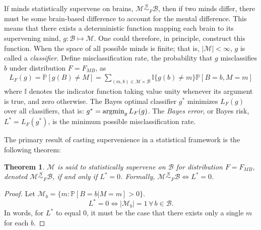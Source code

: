 \documentclass{article}
\newcommand{\mB}{\mathcal{B}}
\newcommand{\mM}{\mathcal{M}}
\newcommand{\PP}{\mathbb{P}}           %
\newcommand{\II}{\mathbb{I}}           %
\providecommand{\mc}[1]{\mathcal{#1}}
\providecommand{\mh}[1]{\widehat{#1}}
\newcommand{\argmin}{\operatornamewithlimits{argmin}}
\newcommand{\MsB}{\mM \overset{S}{\sim}_{F} \mB}
\newtheorem{thm}{Theorem}
\begin{document}
If minds statistically supervene on brains, $\MsB$, then if two minds differ, there must be some brain-based difference to account for the mental difference.  This means that there exists a deterministic function mapping each brain to its supervening mind, $g: \mB \mapsto \mM$. One could therefore, in principle, construct this function. When the space of all possible minds is finite; that is, $|\mM| < \infty$, $g$ is called a \emph{classifier}.  
Define misclassification rate, the probability that $g$ misclassifies $b$ under distribution $F=F_{MB}$,  as
\begin{align}
L_{F}(g) = \PP[g(B) \neq M] =  \sum_{(m,b) \in \mc{M} \times \mc{B}} \II\{g(b) \neq m\} \PP[B=b, M=m]	
\end{align}
where $\II$ denotes the indicator function taking value unity whenever its argument is true, and zero otherwise.  The Bayes optimal classifier $g^*$ minimizes $L_{F}(g)$ over all classifiers, that is:	
$g^* = \argmin_{g} L_{F}(g)$.
The \emph{Bayes error}, or Bayes risk, $L^*=L_{F}(g^*)$, is the minimum possible misclassification rate.

The primary result of casting supervenience in a statistical framework is the following theorem: 
\begin{thm}
\label{thm1} 
$\mM$ is said to \textit{statistically supervene} on $\mB$ for distribution $F=F_{MB}$, denoted $\mM \overset{S}{\sim}_{F} \mB$, if and only if $L^*= 0$. Formally, \mbox{$\MsB \Leftrightarrow L^*=0$}.  
\end{thm}
\begin{proof}
Let $\mc{M}_b=\{m: \PP[B=b | M=m] >0\}$.  
$$L^*=0 \Leftrightarrow |\mc{M}_b|=1 \, \forall \, b \in \mc{B}.$$
In words, for $L^*$ to equal 0, it must be the case that there exists only a single $m$ for each $b$.
\end{proof}

\end{document}
